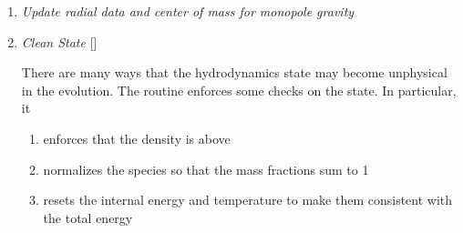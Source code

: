 \begin{enumerate}
  In the Strang-split formulation, we start the reconstruction using
  the state after burning, $\Ub^\star$, and predict to the half-time
  ($n+1/2$) to get a second-order accurate method.  The advection step
  is complicated, and more detail is given in Section
  \ref{Sec:Advection Step}.  Here is the summarized version:
  \begin{enumerate}
  \item Compute primitive variables.
  \item Convert the source terms to those acting on primitive variables
  \item Predict primitive variables to time-centered edges.
  \item Solve the Riemann problem.
  \item Compute fluxes and update.
  \end{enumerate}

  To start the hydrodynamics, we need to know the hydrodynamics source
  terms at time-level $n$, since this enters into the prediction to
  the interface states.  This is essentially the same vector that was
  computed in the previous step, with a few modifications.  The most
  important is that if we set
  , then we extrapolate the
  source terms from $n$ to $n+1/2$, using the change from the previous
  step.

  Note: we neglect the reaction source terms, since those are already
  accounted for in the state directly, due to the Strang-splitting
  nature of this method.


\item \label{strang:radial} {\em Update radial data and center of mass for monopole gravity}


\item \label{strang:clean} {\em Clean State} []

  There are many ways that the hydrodynamics state may become
  unphysical in the evolution.  The  routine
  enforces some checks on the state.  In particular, it
  \begin{enumerate}
  \item enforces that the density is above 
  \item normalizes the species so that the mass fractions sum to 1
  \item resets the internal energy and temperature to 
    make them consistent with the total energy
  \end{enumerate}


\end{enumerate}
